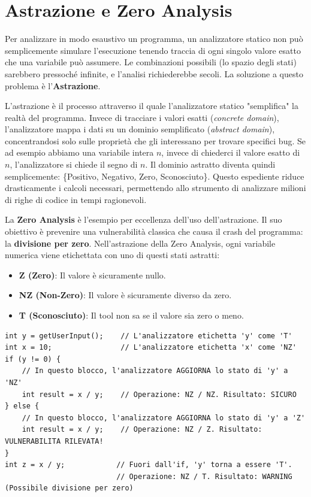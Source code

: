 \section{Astrazione e Zero Analysis}

Per analizzare in modo esaustivo un programma, un analizzatore statico non può 
semplicemente simulare l'esecuzione tenendo traccia di ogni singolo valore esatto 
che una variabile può assumere. Le combinazioni possibili (lo spazio degli stati) 
sarebbero pressoché infinite, e l'analisi richiederebbe secoli. La soluzione a questo 
problema è l'\textbf{Astrazione}.

L'astrazione è il processo attraverso il quale l'analizzatore statico "semplifica" 
la realtà del programma. Invece di tracciare i valori esatti (\textit{concrete domain}), 
l'analizzatore mappa i dati su un dominio semplificato (\textit{abstract domain}), 
concentrandosi solo sulle proprietà che gli interessano per trovare specifici bug.
Se ad esempio abbiamo una variabile intera $n$, invece di chiederci il valore esatto di
$n$, l'analizzatore si chiede il segno di $n$. Il dominio astratto diventa quindi semplicemente:
\{Positivo, Negativo, Zero, Sconosciuto\}. Questo espediente riduce drasticamente i 
calcoli necessari, permettendo allo strumento di analizzare milioni di righe di 
codice in tempi ragionevoli.

La \textbf{Zero Analysis} è l'esempio per eccellenza dell'uso dell'astrazione. Il 
suo obiettivo è prevenire una vulnerabilità classica che causa il crash del programma: 
la \textbf{divisione per zero}. Nell'astrazione della Zero Analysis, ogni variabile 
numerica viene etichettata con uno di questi stati astratti:

\begin{itemize}
    \item \textbf{Z (Zero)}: Il valore è sicuramente nullo.
    \item \textbf{NZ (Non-Zero)}: Il valore è sicuramente diverso da zero.
    \item \textbf{T (Sconosciuto)}: Il tool non sa se il valore sia zero o meno.
\end{itemize}

\begin{lstlisting}
int y = getUserInput();    // L'analizzatore etichetta 'y' come 'T' 
int x = 10;                // L'analizzatore etichetta 'x' come 'NZ' 
if (y != 0) {
    // In questo blocco, l'analizzatore AGGIORNA lo stato di 'y' a 'NZ'
    int result = x / y;    // Operazione: NZ / NZ. Risultato: SICURO 
} else {
    // In questo blocco, l'analizzatore AGGIORNA lo stato di 'y' a 'Z'
    int result = x / y;    // Operazione: NZ / Z. Risultato: VULNERABILITA RILEVATA!
}
int z = x / y;            // Fuori dall'if, 'y' torna a essere 'T'. 
                          // Operazione: NZ / T. Risultato: WARNING (Possibile divisione per zero)
\end{lstlisting}

